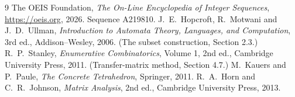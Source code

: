 \documentclass[11pt,a4paper]{article}
\theoremstyle{plain}
\theoremstyle{definition}
\begin{document}
\begin{thebibliography}{9}
 The OEIS Foundation, \emph{The On-Line Encyclopedia of Integer
Sequences}, \url{https://oeis.org}, 2026. Sequence A219810.
 J.~E.~Hopcroft, R.~Motwani and J.~D.~Ullman, \emph{Introduction to Automata
Theory, Languages, and Computation}, 3rd ed., Addison--Wesley, 2006. (The subset
construction, Section 2.3.)
 R.~P.~Stanley, \emph{Enumerative Combinatorics}, Volume 1, 2nd ed.,
Cambridge University Press, 2011. (Transfer-matrix method, Section 4.7.)
 M.~Kauers and P.~Paule, \emph{The Concrete Tetrahedron}, Springer, 2011.
 R.~A.~Horn and C.~R.~Johnson, \emph{Matrix Analysis}, 2nd ed., Cambridge
University Press, 2013.
\end{thebibliography}
\end{document}
